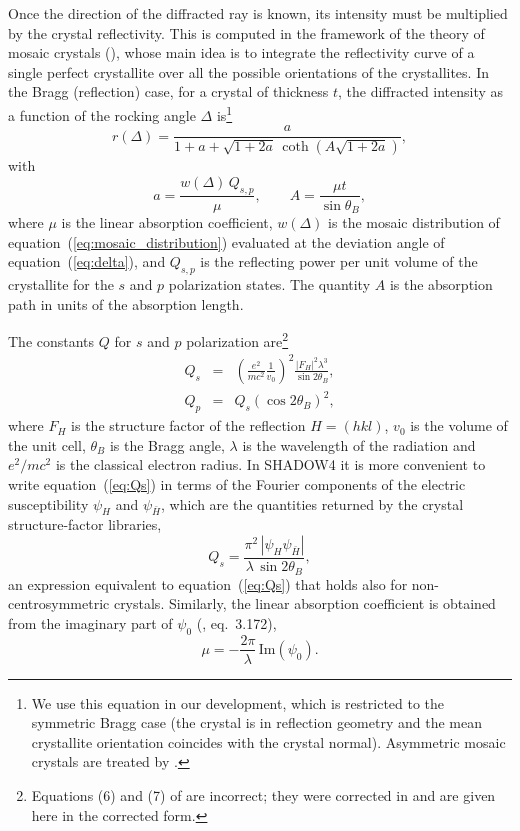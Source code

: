 \documentclass{iucr}
\begin{document}
Once the direction of the diffracted ray is known, its intensity must be
multiplied by the crystal reflectivity. This is computed in the framework of the
theory of mosaic crystals (\cite{zachariasen1945theory,Bacon1948}), whose main idea
is to integrate the reflectivity curve of a single perfect crystallite over all the
possible orientations of the crystallites. In the Bragg (reflection) case, for a
crystal of thickness $t$, the diffracted intensity as a function of the rocking
angle $\Delta$ is\footnote {We use this equation in our development, which is restricted to the symmetric Bragg case (the crystal is in reflection geometry and the mean crystallite orientation coincides with the crystal normal). Asymmetric mosaic crystals are treated by \cite{Sears1997a}.}
\begin{equation}
r(\Delta) = \frac{a}{1 + a + \sqrt{1 + 2a} \, \coth\left( A\sqrt{1 + 2a} \right)} ,
\label{eq:reflectivity}
\end{equation}
with
\begin{equation}
a = \frac{w(\Delta) \, Q_{s,p}}{\mu} ,
\qquad
A = \frac{\mu t}{\sin\theta_B} ,
\label{eq:a_and_A}
\end{equation}
where $\mu$ is the linear absorption coefficient, $w(\Delta)$ is the mosaic
distribution of equation~(\ref{eq:mosaic_distribution}) evaluated at the deviation
angle of equation~(\ref{eq:delta}), and $Q_{s,p}$ is the reflecting power per unit
volume of the crystallite for the $s$ and $p$ polarization states. The quantity
$A$ is the absorption path in units of the absorption length.

The constants $Q$ for $s$ and $p$ polarization
are\footnote{Equations (6) and (7) of \cite{mosaicsSanchezDelRio1992} are
incorrect; they were corrected in \cite{mosaicsSanchezDelRio2013} and are given
here in the corrected form.}
\begin{eqnarray}
Q_s &=& \left( \frac{e^2}{mc^2} \frac{1}{v_0} \right)^2 \frac{|F_H|^2 \lambda^3}{\sin 2\theta_B} ,
\label{eq:Qs} \\
Q_p &=& Q_s \left( \cos 2\theta_B \right)^2 ,
\label{eq:Qp}
\end{eqnarray}
where $F_H$ is the structure factor of the reflection $H=(hkl)$, $v_0$ is the
volume of the unit cell, $\theta_B$ is the Bragg angle, $\lambda$ is the wavelength
of the radiation and $e^2/mc^2$ is the classical electron radius. In SHADOW4 it is
more convenient to write equation~(\ref{eq:Qs}) in terms of the Fourier components
of the electric susceptibility $\psi_H$ and $\psi_{\bar H}$, which are the
quantities returned by the crystal structure-factor libraries,
\begin{equation}
Q_s = \frac{\pi^2 \, | \psi_H \psi_{\bar H} |}{\lambda \, \sin 2\theta_B} ,
\label{eq:Qs_psi}
\end{equation}
an expression equivalent to equation~(\ref{eq:Qs}) that holds also for
non-centrosymmetric crystals. Similarly, the linear absorption coefficient is
obtained from the imaginary part of $\psi_0$ (\cite{zachariasen1945theory},
eq.~3.172),
\begin{equation}
\mu = -\frac{2\pi}{\lambda} \, \mathrm{Im}(\psi_0) .
\label{eq:mu}
\end{equation}
\end{document}
